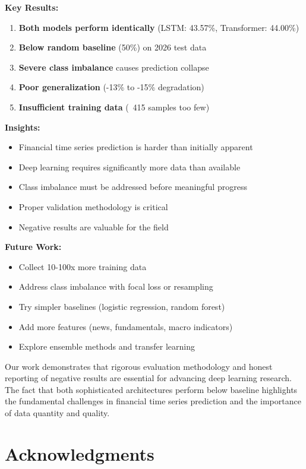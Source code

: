 \documentclass[10pt,twocolumn]{article}
\begin{document}
\textbf{Key Results:}
\begin{enumerate}
\item \textbf{Both models perform identically} (LSTM: 43.57\%, Transformer: 44.00\%)
\item \textbf{Below random baseline} (50\%) on 2026 test data
\item \textbf{Severe class imbalance} causes prediction collapse
\item \textbf{Poor generalization} (-13\% to -15\% degradation)
\item \textbf{Insufficient training data} (~415 samples too few)
\end{enumerate}

\textbf{Insights:}
\begin{itemize}
\item Financial time series prediction is harder than initially apparent
\item Deep learning requires significantly more data than available
\item Class imbalance must be addressed before meaningful progress
\item Proper validation methodology is critical
\item Negative results are valuable for the field
\end{itemize}

\textbf{Future Work:}
\begin{itemize}
\item Collect 10-100x more training data
\item Address class imbalance with focal loss or resampling
\item Try simpler baselines (logistic regression, random forest)
\item Add more features (news, fundamentals, macro indicators)
\item Explore ensemble methods and transfer learning
\end{itemize}

Our work demonstrates that rigorous evaluation methodology and honest reporting of negative results are essential for advancing deep learning research. The fact that both sophisticated architectures perform below baseline highlights the fundamental challenges in financial time series prediction and the importance of data quantity and quality.

\section*{Acknowledgments}
\end{document}
